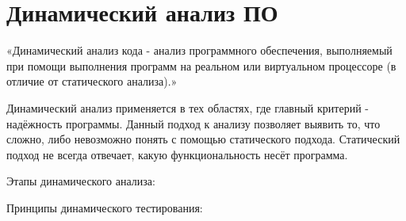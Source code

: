 \section{Динамический анализ ПО}
«Динамический анализ кода - анализ программного обеспечения, выполняемый при помощи выполнения программ на реальном или виртуальном процессоре (в отличие от статического анализа).» \cite{wiki}

Динамический анализ применяется в тех областях,
	где главный критерий - надёжность программы.
Данный подход к анализу позволяет выявить то,
	что сложно, либо невозможно понять с помощью статического подхода.
Статический подход не всегда отвечает,
	какую функциональность несёт программа.

Этапы динамического анализа:


Принципы динамического тестирования:

